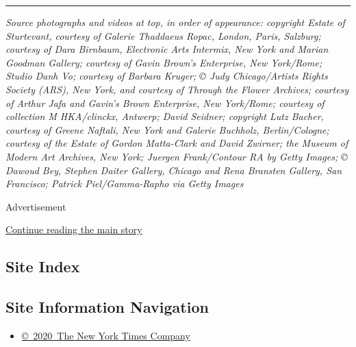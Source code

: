 \begin{center}\rule{0.5\linewidth}{\linethickness}\end{center}

\emph{Source photographs and videos at top, in order of appearance:
copyright Estate of Sturtevant, courtesy of Galerie Thaddaeus Ropac,
London, Paris, Salzburg; courtesy of Dara Birnbaum, Electronic Arts
Intermix, New York and Marian Goodman Gallery; courtesy of Gavin Brown's
Enterprise, New York/Rome; Studio Danh Vo; courtesy of Barbara Kruger; ©
Judy Chicago/Artists Rights Society (ARS), New York, and courtesy of
Through the Flower Archives; courtesy of Arthur Jafa and Gavin's Brown
Enterprise, New York/Rome; courtesy of collection M HKA/clinckx,
Antwerp; David Seidner; copyright Lutz Bacher, courtesy of Greene
Naftali, New York and Galerie Buchholz, Berlin/Cologne; courtesy of the
Estate of Gordon Matta-Clark and David Zwirner; the Museum of Modern Art
Archives, New York; Juergen Frank/Contour RA by Getty Images; © Dawoud
Bey, Stephen Daiter Gallery, Chicago and Rena Bransten Gallery, San
Francisco; Patrick Piel/Gamma-Rapho via Getty Images}

Advertisement

\protect\hyperlink{after-bottom}{Continue reading the main story}

\hypertarget{site-index}{%
\subsection{Site Index}\label{site-index}}

\hypertarget{site-information-navigation}{%
\subsection{Site Information
Navigation}\label{site-information-navigation}}

\begin{itemize}
\tightlist
\item
  \href{https://help.nytimes.com/hc/en-us/articles/115014792127-Copyright-notice}{©~2020~The
  New York Times Company}
\end{itemize}

